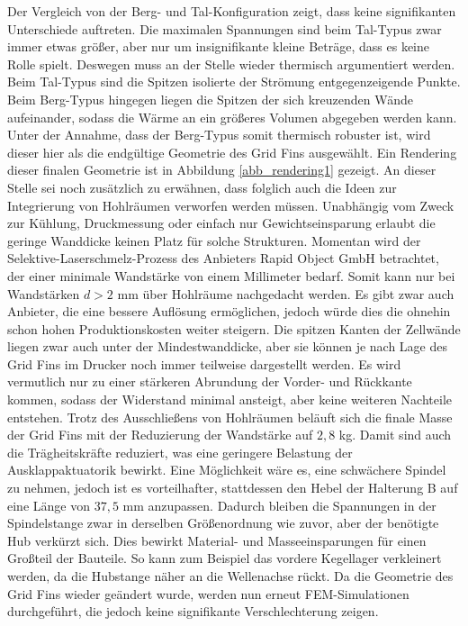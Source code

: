 Der Vergleich von der Berg- und Tal-Konfiguration zeigt, dass keine signifikanten Unterschiede auftreten. Die maximalen Spannungen sind beim Tal-Typus zwar immer etwas größer, aber nur um insignifikante kleine Beträge, dass es keine Rolle spielt. Deswegen muss an der Stelle wieder thermisch argumentiert werden. Beim Tal-Typus sind die Spitzen isolierte der Strömung entgegenzeigende Punkte. Beim Berg-Typus hingegen liegen die Spitzen der sich kreuzenden Wände aufeinander, sodass die Wärme an ein größeres Volumen abgegeben werden kann. Unter der Annahme, dass der Berg-Typus somit thermisch robuster ist, wird dieser hier als die endgültige Geometrie des Grid Fins ausgewählt. Ein Rendering dieser finalen Geometrie ist in Abbildung \ref{abb_rendering1} gezeigt.
An dieser Stelle sei noch zusätzlich zu erwähnen, dass folglich auch die Ideen zur Integrierung von Hohlräumen verworfen werden müssen. Unabhängig vom Zweck zur Kühlung, Druckmessung oder einfach nur Gewichtseinsparung erlaubt die geringe Wanddicke keinen Platz für solche Strukturen. Momentan wird der Selektive-Laserschmelz-Prozess des Anbieters Rapid Object GmbH betrachtet, der einer minimale Wandstärke von einem Millimeter bedarf. Somit kann nur bei Wandstärken $d>2$ mm über Hohlräume nachgedacht werden. Es gibt zwar auch Anbieter, die eine bessere Auflösung ermöglichen, jedoch würde dies die ohnehin schon hohen Produktionskosten weiter steigern. Die spitzen Kanten der Zellwände liegen zwar auch unter der Mindestwanddicke, aber sie können je nach Lage des Grid Fins im Drucker noch immer teilweise dargestellt werden. Es wird vermutlich nur zu einer stärkeren Abrundung der Vorder- und Rückkante kommen, sodass der Widerstand minimal ansteigt, aber keine weiteren Nachteile entstehen. Trotz des Ausschließens von Hohlräumen beläuft sich die finale Masse der Grid Fins mit der Reduzierung der Wandstärke auf $2,8$ kg. Damit sind auch die Trägheitskräfte reduziert, was eine geringere Belastung der Ausklappaktuatorik bewirkt. Eine Möglichkeit wäre es, eine schwächere Spindel zu nehmen, jedoch ist es vorteilhafter, stattdessen den Hebel der Halterung B auf eine Länge von $37,5$ mm anzupassen. Dadurch bleiben die Spannungen in der Spindelstange zwar in derselben Größenordnung wie zuvor, aber der benötigte Hub verkürzt sich. Dies bewirkt Material- und Masseeinsparungen für einen Großteil der Bauteile. So kann zum Beispiel das vordere Kegellager verkleinert werden, da die Hubstange näher an die Wellenachse rückt. Da die Geometrie des Grid Fins wieder geändert wurde, werden nun erneut FEM-Simulationen durchgeführt, die jedoch keine signifikante Verschlechterung zeigen.
